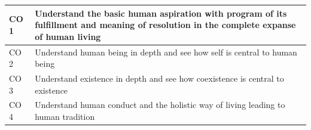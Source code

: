 \documentclass{rvcepaper}
\begin{document}
\begin{xpaper}
\noindent\begin{tabular}{|C{1.3cm}|p{15cm}|}\hline CO 1 & Understand the basic human aspiration with program of its fulfillment and meaning of resolution in the complete expanse of human living\\\hline CO 2 & Understand human being in depth and see how self is central to human being\\\hline CO 3 & Understand existence in depth and see how coexistence is central to existence\\\hline CO 4 & Understand human conduct and the holistic way of living leading to human tradition\\\hline\end{tabular}
\stars{**********}
\end{xpaper}
\end{document}
